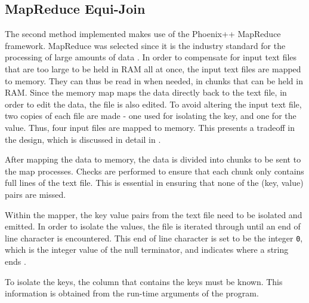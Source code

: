 \documentclass[10pt,twocolumn]{witseiepaper}
\begin{document}
\subsection{MapReduce Equi-Join}
The second method implemented makes use of the Phoenix++ MapReduce framework. MapReduce was selected since it is the industry standard for the processing of large amounts of data \cite{comparingMPIMapReduce}. In order to compensate for input text files that are too large to be held in RAM all at once, the input text files are mapped to memory. They can thus be read in when needed, in chunks that can be held in RAM. Since the memory map maps the data directly back to the text file, in order to edit the data, the file is also edited. To avoid altering the input text file, two copies of each file are made - one used for isolating the key, and one for the value. Thus, four input files are mapped to memory. This presents a tradeoff in the design, which is discussed in detail in .

After mapping the data to memory, the data is divided into chunks to be sent to the map processes. Checks are performed to ensure that each chunk only contains full lines of the text file. This is essential in ensuring that none of the (key, value) pairs are missed.

Within the mapper, the key value pairs from the text file need to be isolated and emitted. In order to isolate the values, the file is iterated through until an end of line character is encountered. This end of line character is set to be the integer \texttt{0}, which is the integer value of the null terminator, and indicates where a string ends \cite{phoenix}.

To isolate the keys, the column that contains the keys must be known. This information is obtained from the run-time arguments of the program.  
\end{document}
